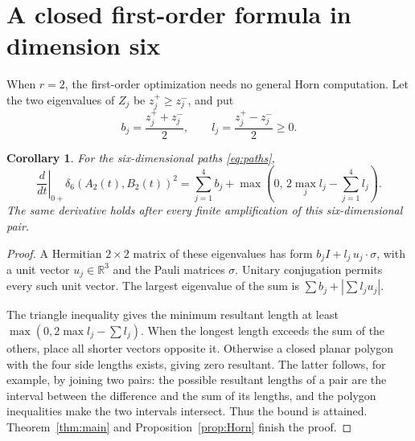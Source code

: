 \documentclass[11pt]{article}
\newtheorem{corollary}[theorem]{Corollary}
\theoremstyle{remark}\newtheorem{remark}[theorem]{Remark}
\newcommand{\R}{\mathbb R}
\newcommand{\dd}{\delta}
\begin{document}
\section{A closed first-order formula in dimension six}
When $r=2$, the first-order optimization needs no general Horn computation. Let the two eigenvalues of $Z_j$ be $z_j^+\ge z_j^-$, and put
\[
 b_j=\frac{z_j^++z_j^-}{2},\qquad l_j=\frac{z_j^+-z_j^-}{2}\ge0.
\]
\begin{corollary}\label{cor:two}
For the six-dimensional paths \eqref{eq:paths},
\begin{equation}\label{eq:polygon}
 \left.\frac{d}{dt}\right|_{0+}\dd_6(A_2(t),B_2(t))^2
 =\sum_{j=1}^4 b_j+
 \max\left(0,\,2\max_j l_j-\sum_{j=1}^4l_j\right).
\end{equation}
The same derivative holds after every finite amplification of this six-dimensional pair.
\end{corollary}
\begin{proof}
A Hermitian $2\times2$ matrix of these eigenvalues has form $b_jI+l_j\,u_j\cdot\sigma$, with a unit vector $u_j\in\R^3$ and the Pauli matrices $\sigma$. Unitary conjugation permits every such unit vector. The largest eigenvalue of the sum is $\sum b_j+|\sum l_ju_j|$.

The triangle inequality gives the minimum resultant length at least $\max(0,2\max l_j-\sum l_j)$. When the longest length exceeds the sum of the others, place all shorter vectors opposite it. Otherwise a closed planar polygon with the four side lengths exists, giving zero resultant. The latter follows, for example, by joining two pairs: the possible resultant lengths of a pair are the interval between the difference and the sum of its lengths, and the polygon inequalities make the two intervals intersect. Thus the bound is attained. Theorem~\ref{thm:main} and Proposition~\ref{prop:Horn} finish the proof.
\end{proof}
\end{document}
